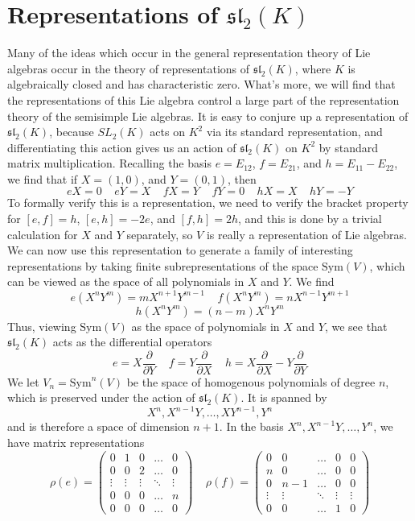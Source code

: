 \section{Representations of $\mathfrak{sl}_2(K)$}

Many of the ideas which occur in the general representation theory of Lie algebras occur in the theory of representations of $\mathfrak{sl}_2(K)$, where $K$ is algebraically closed and has characteristic zero. What's more, we will find that the representations of this Lie algebra control a large part of the representation theory of the semisimple Lie algebras. It is easy to conjure up a representation of $\mathfrak{sl}_2(K)$, because $SL_2(K)$ acts on $K^2$ via its standard representation, and differentiating this action gives us an action of $\mathfrak{sl}_2(K)$ on $K^2$ by standard matrix multiplication. Recalling the basis $e = E_{12}$, $f = E_{21}$, and $h = E_{11} - E_{22}$, we find that if $X = (1,0)$, and $Y = (0,1)$, then
%
\[ eX = 0\ \ \ \ \ eY = X\ \ \ \ \ fX = Y\ \ \ \ \ fY = 0\ \ \ \ \ hX = X\ \ \ \ \ hY = -Y \]
%
To formally verify this is a representation, we need to verify the bracket property for $[e,f] = h$, $[e,h] = -2e$, and $[f,h] = 2h$, and this is done by a trivial calculation for $X$ and $Y$ separately, so $V$ is really a representation of Lie algebras. We can now use this representation to generate a family of interesting representations by taking finite subrepresentations of the space $\text{Sym}(V)$, which can be viewed as the space of all polynomials in $X$ and $Y$. We find
%
\[ e(X^nY^m) = mX^{n+1}Y^{m-1}\ \ \ \ \ f(X^nY^m) = nX^{n-1}Y^{m+1} \]
\[ h(X^nY^m) = (n-m)X^nY^m \]
%
Thus, viewing $\text{Sym}(V)$ as the space of polynomials in $X$ and $Y$, we see that $\mathfrak{sl}_2(K)$ acts as the differential operators
%
\[ e = X \frac{\partial}{\partial Y}\ \ \ \ \ f = Y \frac{\partial}{\partial X}\ \ \ \ \ h = X \frac{\partial}{\partial X} - Y \frac{\partial}{\partial Y} \]
%
We let $V_n = \text{Sym}^n(V)$ be the space of homogenous polynomials of degree $n$, which is preserved under the action of $\mathfrak{sl}_2(K)$. It is spanned by
%
\[ X^n, X^{n-1}Y, \dots, XY^{n-1}, Y^n \]
%
and is therefore a space of dimension $n+1$. In the basis $X^n,X^{n-1}Y, \dots, Y^n$, we have matrix representations
%
\[ \rho(e) = \begin{pmatrix} 0 & 1 & 0 & \dots & 0 \\ 0 & 0 & 2 & \dots & 0 \\ \vdots & \vdots & \vdots & \ddots & \vdots \\ 0 & 0 & 0 & \dots & n \\ 0 & 0 & 0 & \dots & 0 \end{pmatrix}\ \ \ \ \ \rho(f) = \begin{pmatrix} 0 & 0 & \dots & 0 & 0 \\ n & 0 & \dots & 0 & 0 \\ 0 & n-1 & \dots & 0 & 0 \\ \vdots & \vdots & \ddots & \vdots & \vdots \\ 0 & 0 & \dots & 1 & 0 \end{pmatrix} \]
